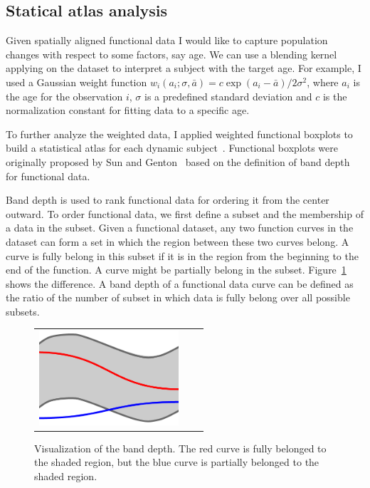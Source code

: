 \subsection{Statical atlas analysis}
\label{sec:statical_atlas_analysis}
Given spatially aligned functional data I would like to capture population changes with respect to some factors, say age.
We can use a blending kernel applying on the dataset to interpret a subject with the target age.
For example, I used a Gaussian weight function $w_i(a_i; \sigma, \bar{a}) = c\exp{(a_i-\bar{a})/2\sigma^2}$, where $a_i$ is the age for the observation $i$, $\sigma$ is a predefined standard deviation and $c$ is the normalization constant for fitting data to a specific age.

To further analyze the weighted data, I applied weighted functional boxplots to build a statistical atlas for each dynamic subject~\cite{hong2013weighted}.
Functional boxplots were originally proposed by Sun and Genton~\cite{sun2011functional} based on the definition of band depth for functional data.

Band depth is used to rank functional data for ordering it from the center outward.
To order functional data, we first define a subset and the membership of a data in the subset.
Given a functional dataset, any two function curves in the dataset can form a set in which the region between these two curves belong.
A curve is fully belong in this subset if it is in the region from the beginning to the end of the function.
A curve might be partially belong in the subset.
Figure~\ref{fig:vis_fbplot} shows the difference.
A band depth of a functional data curve can be defined as the ratio of the number of subset in which data is fully belong over all possible subsets.

\begin{figure}[tb]
  \begin{center}
    \begin{tabular}{ccc}
    \includegraphics[height=35mm] {fig/illustration_fbplots.png}
    \end{tabular}
    \caption{ \label{fig:vis_fbplot} Visualization of the band depth. The red curve is fully belonged to the shaded region, but the blue curve is partially belonged to the shaded region.
    }
  \end{center}
\end{figure}

